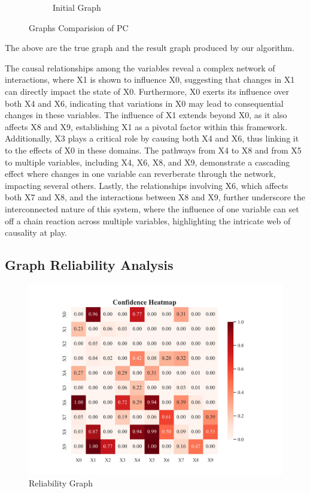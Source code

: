 \documentclass{article}
\begin{document}
\begin{figure}[H]
\begin{subfigure}{0.45\textwidth}
        \vfill
        \caption{Initial Graph}
        \label{fig:sub2}
    \end{subfigure}
    \caption{Graphs Comparision of PC}
    \label{fig:main}
\end{figure}

The above are the true graph and the result graph produced by our algorithm.

The causal relationships among the variables reveal a complex network of interactions, where X1 is shown to influence X0, suggesting that changes in X1 can directly impact the state of X0. Furthermore, X0 exerts its influence over both X4 and X6, indicating that variations in X0 may lead to consequential changes in these variables. The influence of X1 extends beyond X0, as it also affects X8 and X9, establishing X1 as a pivotal factor within this framework. Additionally, X3 plays a critical role by causing both X4 and X6, thus linking it to the effects of X0 in these domains. The pathways from X4 to X8 and from X5 to multiple variables, including X4, X6, X8, and X9, demonstrate a cascading effect where changes in one variable can reverberate through the network, impacting several others. Lastly, the relationships involving X6, which affects both X7 and X8, and the interactions between X8 and X9, further underscore the interconnected nature of this system, where the influence of one variable can set off a chain reaction across multiple variables, highlighting the intricate web of causality at play.

\subsection{Graph Reliability Analysis}

\begin{figure}[H]
        \centering
        \vspace{-0.5cm}
        \includegraphics[width=0.8\linewidth]{postprocess/test_data/20241018_020318_base_nodes10_samples2000/output_graph/confidence_heatmap.jpg}
        \caption{Reliability Graph}
        \label{fig:sub3}
\end{figure}
\end{document}
